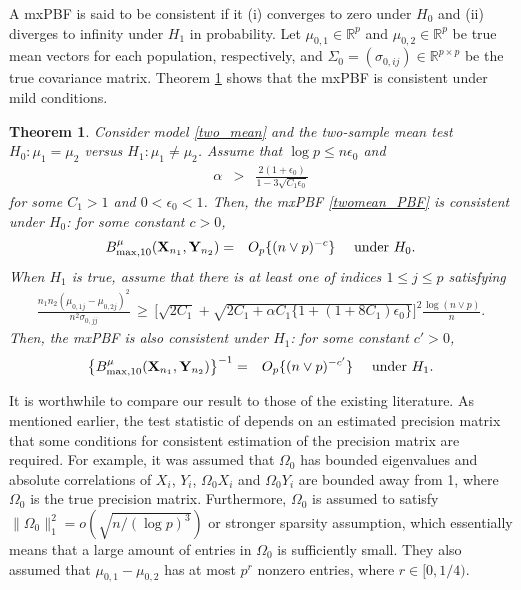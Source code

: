 \documentclass[11pt]{article}
\newtheorem{theorem}{Theorem}[section]
\newcommand{\bea}{\begin{eqnarray*}}
\newcommand{\eea}{\end{eqnarray*}}
\newcommand{\bean}{\begin{eqnarray}}
\newcommand{\eean}{\end{eqnarray}}
\newcommand{\bfX}{{\bf X}}
\newcommand{\bfY}{{\bf Y}}
\newcommand{\bbR}{\mathbb{R}}
\begin{document}
A mxPBF is said to be consistent if it (i) converges to zero under $H_0$ and (ii) diverges to infinity under $H_1$ in probability.
Let $\mu_{0,1} \in \bbR^p$ and $\mu_{0,2} \in \bbR^p$ be true mean vectors for each population, respectively, and $\Sigma_0 = (\sigma_{0,ij}) \in \bbR^{p\times p}$ be the true covariance matrix.
Theorem \ref{thm:two_mean} shows that the mxPBF is consistent under mild conditions.

\begin{theorem}\label{thm:two_mean}
	Consider model \eqref{two_mean} and the two-sample mean test $H_0: \mu_1=\mu_2$ versus $H_1:\mu_1\neq \mu_2$.
	Assume that $\log p \le n \epsilon_0$ and
	\bean
	\alpha &>&   \frac{2(1 + \epsilon_0)}{1 - 3 \sqrt{C_1 \epsilon_0}}   \label{alpha_mean}
	\eean
	for some $C_1>1$ and $0<\epsilon_0<1$.
	Then, the mxPBF \eqref{twomean_PBF} is consistent under $H_0$: for some constant $c>0$,
	\bea
	B_{\max,10}^{\mu}(\bfX_{n_1}, \bfY_{n_2})  &=&O_p\{(n\vee p)^{-c}\}  \quad \text{ under $H_0$} .
	\eea
	When $H_1$ is true, assume that there is at least one of indices $1\le j\le p$ satisfying
	\bean
	\frac{n_1 n_2(\mu_{0,1j}-\mu_{0,2j})^2}{n^2 \sigma_{0,jj}} \,\ge\,  \Big[ \sqrt{2C_1} + \sqrt{2C_1 + \alpha C_1 \{ 1+ (1+ 8 C_1)\epsilon_0 \} } \Big]^2 \frac{\log(n\vee p)}{n} . \label{betamin_mean}
	\eean
	Then, the mxPBF is also consistent under $H_1$: for some constant $c'>0$,
	\bea
	\big\{B_{\max,10}^{\mu}(\bfX_{n_1}, \bfY_{n_2})\big\}^{-1}  &=&O_p\{(n\vee p)^{-c'}\}     \quad \text{ under $H_1$}.
	\eea
\end{theorem}

It is worthwhile to compare our result to those of the existing literature.
As mentioned earlier, the test statistic of \cite{cai2014two} depends on an estimated precision matrix that some conditions for consistent estimation of the precision matrix are required.
For example, it was assumed that $\Omega_0$ has bounded eigenvalues and absolute correlations of $X_i$, $Y_i$, $\Omega_0 X_i$ and $\Omega_0 Y_i$ are bounded away from 1, where $\Omega_0$ is the true precision matrix.
Furthermore, $\Omega_0$ is assumed to satisfy $\|\Omega_0\|_1^2 = o( \sqrt{n/(\log p)^3} )$ or stronger sparsity assumption, which essentially means that a large amount of entries in $\Omega_0$ is sufficiently small.
They also assumed that $\mu_{0,1}-\mu_{0,2}$ has at most $p^r$ nonzero entries, where $r \in [0,1/4)$.
\end{document}
